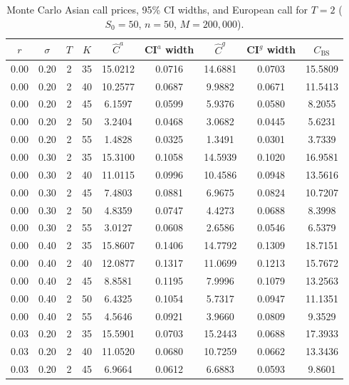 \documentclass[11pt,a4paper]{article}
\theoremstyle{plain}
\theoremstyle{definition}
\begin{document}
\begin{table}[H]
  \centering
  \caption{Monte Carlo Asian call prices, 95\% CI widths, and European call
           for $T=2$ ($S_0=50$, $n=50$, $M=200{,}000$).}
  \label{tab:mc-prices-2}
  \small
  \renewcommand{\arraystretch}{1.1}
  \begin{tabular}{cccc|cc|cc|c}
    \toprule
    $r$ & $\sigma$ & $T$ & $K$
      & $\hat{C}^{a}$ & CI$^{a}$ width
      & $\hat{C}^{g}$ & CI$^{g}$ width
      & $C_{\mathrm{BS}}$ \\
    \midrule
    0.00 & 0.20 & 2 & 35 & 15.0212 & 0.0716 & 14.6881 & 0.0703 & 15.5809 \\
    0.00 & 0.20 & 2 & 40 & 10.2577 & 0.0687 &  9.9882 & 0.0671 & 11.5413 \\
    0.00 & 0.20 & 2 & 45 &  6.1597 & 0.0599 &  5.9376 & 0.0580 &  8.2055 \\
    0.00 & 0.20 & 2 & 50 &  3.2404 & 0.0468 &  3.0682 & 0.0445 &  5.6231 \\
    0.00 & 0.20 & 2 & 55 &  1.4828 & 0.0325 &  1.3491 & 0.0301 &  3.7339 \\
    \midrule
    0.00 & 0.30 & 2 & 35 & 15.3100 & 0.1058 & 14.5939 & 0.1020 & 16.9581 \\
    0.00 & 0.30 & 2 & 40 & 11.0115 & 0.0996 & 10.4586 & 0.0948 & 13.5616 \\
    0.00 & 0.30 & 2 & 45 &  7.4803 & 0.0881 &  6.9675 & 0.0824 & 10.7207 \\
    0.00 & 0.30 & 2 & 50 &  4.8359 & 0.0747 &  4.4273 & 0.0688 &  8.3998 \\
    0.00 & 0.30 & 2 & 55 &  3.0127 & 0.0608 &  2.6586 & 0.0546 &  6.5379 \\
    \midrule
    0.00 & 0.40 & 2 & 35 & 15.8607 & 0.1406 & 14.7792 & 0.1309 & 18.7151 \\
    0.00 & 0.40 & 2 & 40 & 12.0877 & 0.1317 & 11.0699 & 0.1213 & 15.7672 \\
    0.00 & 0.40 & 2 & 45 &  8.8581 & 0.1195 &  7.9996 & 0.1079 & 13.2563 \\
    0.00 & 0.40 & 2 & 50 &  6.4325 & 0.1054 &  5.7317 & 0.0947 & 11.1351 \\
    0.00 & 0.40 & 2 & 55 &  4.5646 & 0.0921 &  3.9660 & 0.0809 &  9.3529 \\
    \midrule
    0.03 & 0.20 & 2 & 35 & 15.5901 & 0.0703 & 15.2443 & 0.0688 & 17.3933 \\
    0.03 & 0.20 & 2 & 40 & 11.0520 & 0.0680 & 10.7259 & 0.0662 & 13.3436 \\
    0.03 & 0.20 & 2 & 45 &  6.9664 & 0.0612 &  6.6883 & 0.0593 &  9.8601 \\

\end{tabular}
\end{table}
\end{document}
